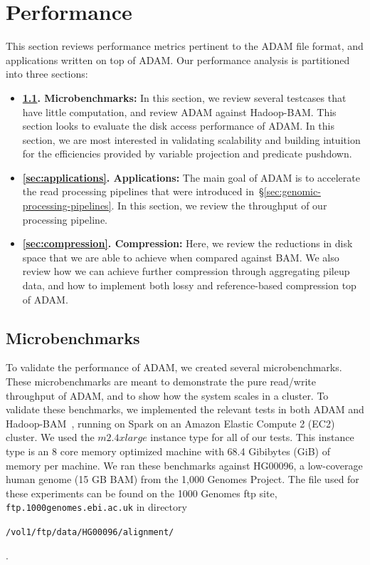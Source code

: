 \documentclass[10pt,twocolumn]{article}
\theoremstyle{plain}
\begin{document}
\section{Performance}
\label{sec:performance}

This section reviews performance metrics pertinent to the ADAM file format, and applications written on top of ADAM. Our performance
analysis is partitioned into three sections:

\begin{itemize}
\item {\bf \ref{sec:microbenchmarks}. Microbenchmarks:} In this section, we review several testcases that have little computation, and
review ADAM against Hadoop-BAM. This section looks to evaluate the disk access performance of ADAM. In this section, we are most
interested in validating scalability and building intuition for the efficiencies provided by variable projection and predicate pushdown.
\item {\bf \ref{sec:applications}. Applications:} The main goal of ADAM is to accelerate the read processing pipelines that were introduced
in~\S\ref{sec:genomic-processing-pipelines}. In this section, we review the throughput of our processing pipeline.
\item {\bf \ref{sec:compression}. Compression:} Here, we review the reductions in disk space that we are able to achieve when compared
against BAM. We also review how we can achieve further compression through aggregating pileup data, and how to implement both
lossy and reference-based compression top of ADAM.
\end{itemize}

\subsection{Microbenchmarks}
\label{sec:microbenchmarks}

To validate the performance of ADAM, we created several microbenchmarks. These microbenchmarks are meant to demonstrate
the pure read/write throughput of ADAM, and to show how the system scales in a cluster. To validate these benchmarks, we implemented
the relevant tests in both ADAM and Hadoop-BAM~\cite{niemenmaa12}, running on Spark on an Amazon Elastic Compute 2 (EC2)
cluster. We used the $m2.4xlarge$ instance type for all of our tests. This instance type is an 8 core memory optimized machine
with 68.4 Gibibytes (GiB) of memory per machine. We ran these benchmarks against HG00096, a low-coverage human genome (15 GB
BAM) from the 1,000 Genomes Project. The file used for these experiments can be found on the 1000 Genomes ftp site, \texttt{ftp.1000genomes.ebi.ac.uk} in directory 
\begin{small}\texttt{/vol1/ftp/data/HG00096/alignment/}\end{small}.
\end{document}
